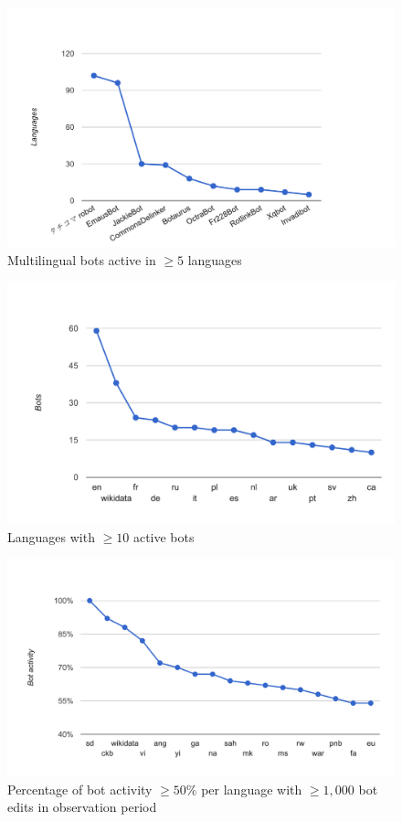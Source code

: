 \documentclass{sig-alternate}
\begin{document}
\begin{figure}[p]
  \center
  \includegraphics[width=\linewidth]{multilingual-bots.pdf}
  \caption{Multilingual bots active in $\geq5$ languages}
  \label{fig:multilingual-bots}
\end{figure}

\begin{figure}[p]
  \center
  \includegraphics[width=\linewidth]{bots-per-language.pdf}
  \caption{Languages with $\geq10$ active bots}
  \label{fig:bots-per-language}
\end{figure}

\begin{figure}[p]
  \center
  \includegraphics[width=\linewidth]{most-bot-edited-languages.pdf}
  \caption{Percentage of bot activity $\geq50\%$ per language with $\geq1,000$ bot edits in observation period}
  \label{fig:most-bot-edited-languages}
\end{figure}
\end{document}
